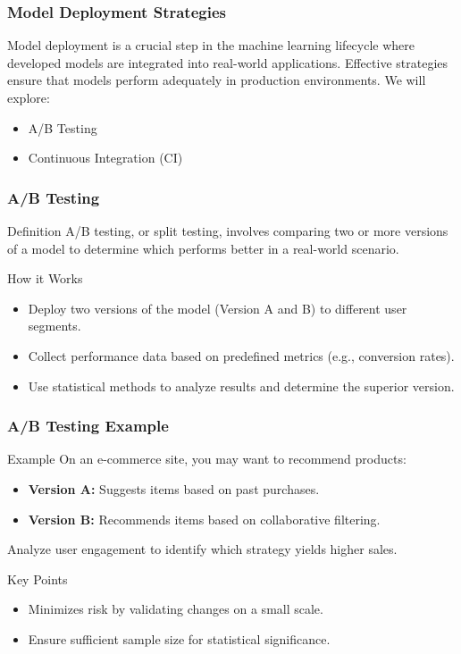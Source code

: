\documentclass[aspectratio=169]{beamer}
\begin{document}
\begin{frame}[fragile]
    \frametitle{Model Deployment Strategies}
    Model deployment is a crucial step in the machine learning lifecycle where developed models are integrated into real-world applications. Effective strategies ensure that models perform adequately in production environments. We will explore:
    \begin{itemize}
        \item A/B Testing
        \item Continuous Integration (CI)
    \end{itemize}
\end{frame}

\begin{frame}[fragile]
    \frametitle{A/B Testing}
    \begin{block}{Definition}
        A/B testing, or split testing, involves comparing two or more versions of a model to determine which performs better in a real-world scenario.
    \end{block}
    
    \begin{block}{How it Works}
        \begin{itemize}
            \item Deploy two versions of the model (Version A and B) to different user segments.
            \item Collect performance data based on predefined metrics (e.g., conversion rates).
            \item Use statistical methods to analyze results and determine the superior version.
        \end{itemize}
    \end{block}
\end{frame}

\begin{frame}[fragile]
    \frametitle{A/B Testing Example}
    \begin{block}{Example}
        On an e-commerce site, you may want to recommend products:
        \begin{itemize}
            \item \textbf{Version A:} Suggests items based on past purchases.
            \item \textbf{Version B:} Recommends items based on collaborative filtering.
        \end{itemize}
        Analyze user engagement to identify which strategy yields higher sales.
    \end{block}

    \begin{block}{Key Points}
        \begin{itemize}
            \item Minimizes risk by validating changes on a small scale.
            \item Ensure sufficient sample size for statistical significance.
        \end{itemize}
    \end{block}
\end{frame}
\end{document}
